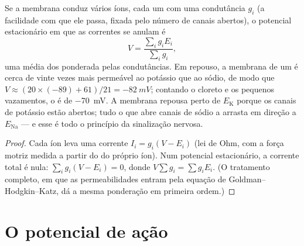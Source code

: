\begin{theorem}\label{thm:b2:neurons-synapses:chord}
Se a membrana conduz vários íons, cada um com uma condutância $g_i$ (a
facilidade com que ele passa, fixada pelo número de canais abertos), o
potencial estacionário em que as correntes se anulam é
\[
V = \frac{\sum_i g_i E_i}{\sum_i g_i},
\]
uma média dos  ponderada pelas condutâncias. Em
repouso, a membrana de um  é cerca de vinte vezes mais
permeável ao potássio que ao sódio, de modo que
$V \approx (20\times(-89) +
61)/21 = \qty{-82}{mV}$; contando o cloreto e os pequenos vazamentos, o
 é de \qty{-70}{mV}. A membrana repousa perto de
$E_{\mathrm K}$ porque os canais de potássio estão abertos; tudo o que
abre canais de sódio a arrasta em direção a $E_{\mathrm{Na}}$ --- e esse
é todo o princípio da sinalização nervosa.
\end{theorem}
\begin{proof}
Cada íon leva uma corrente $I_i = g_i(V - E_i)$ (lei de Ohm, com a força
motriz medida a partir do  do próprio íon). Num
potencial estacionário, a corrente total é nula: $\sum_i g_i(V - E_i) =
0$, donde $V\sum g_i = \sum g_iE_i$. (O tratamento completo, em que as
permeabilidades entram pela equação de Goldman--Hodgkin--Katz, dá a
mesma ponderação em primeira ordem.)
\end{proof}

\section{O potencial de ação}

